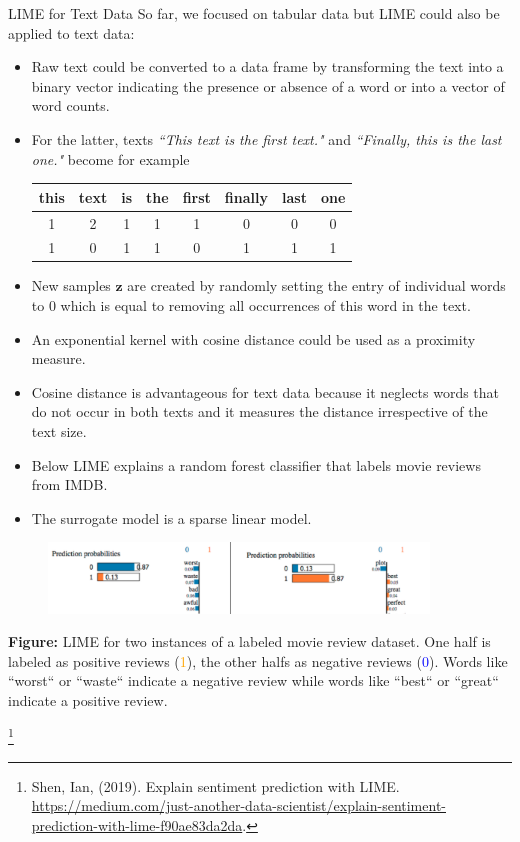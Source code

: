 \documentclass[11pt,compress,t,notes=noshow, xcolor=table]{beamer}
\newcommand{\zv}{\mathbf{z}}
\begin{document}
\begin{vbframe}{LIME for Text Data}
	So far, we focused on tabular data but LIME could also be applied to text data: 
	\begin{itemize}
		\item Raw text could be converted to a data frame by transforming the text into a binary vector indicating the presence or absence of a word or into a vector of word counts.
		\item For the latter, texts \textit{``This text is the first text."} and \textit{``Finally, this is the last one."} become for example 
		\begin{center}
			\begin{tabular}{c|c|c|c|c|c|c|c} 
				this & text & is & the & first & finally & last & one \\ 
				\hline
				1 & 2 & 1 & 1 & 1 & 0 & 0 & 0 \\
				1 & 0 & 1 & 1 & 0 & 1 & 1 & 1 \\
			\end{tabular}
		\end{center} 
		\item New samples $\zv$ are created by randomly setting the entry of individual words to $0$ which is equal to removing all occurrences of this word in the text. 
		\item An exponential kernel with cosine distance could be used as a proximity measure. 
		\item Cosine distance is advantageous for text data because it neglects words that do not occur in both texts and it measures the distance irrespective of the text size. 
		\item Below LIME explains a random forest classifier that labels movie reviews from IMDB. 
		\item The surrogate model is a sparse linear model. 
	\end{itemize}
	
	\begin{figure}
		\begin{center}
			\includegraphics[width=0.9\textwidth]{figure/lime_movier}
		\end{center}
	\end{figure}
	
	
	\scriptsize{\textbf{Figure:} LIME for two instances of a labeled movie review dataset. One half is labeled as positive reviews (\textcolor{orange}{1}), 
		the other halfs as negative reviews (\textcolor{blue}{0}). Words like ``worst`` or ``waste`` indicate a negative review while words like ``best`` or ``great`` indicate a positive review.}
	
	\footnote[frame]{Shen, Ian, (2019). Explain sentiment prediction with LIME.
		\url{https://medium.com/just-another-data-scientist/explain-sentiment-prediction-with-lime-f90ae83da2da}.}
	
	
	\end{vbframe}
	
\end{document}
